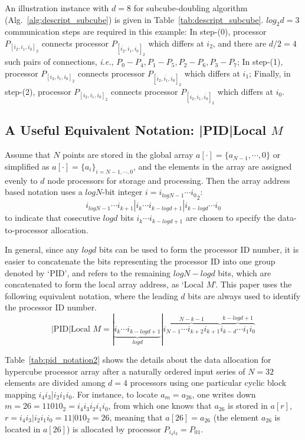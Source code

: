 \documentclass{iacrtrans}
\theoremstyle{plain}
\begin{document}
An illustration instance with $d=8$ for subcube-doubling algorithm (Alg.~\ref{alg:descript_subcube}) is given in Table~\ref{tab:descript_subcube}. $log_2d=3$ communication steps are required in this example: In step-(0), processor $P_{[i_{2},i_{1},i_{0}]_2}$ connects processor $P_{[\overline{i_{2}},i_{1},i_{0}]_2}$ which differs at $i_{2}$, and there are $d/2=4$ such pairs of connections, \textit{i.e.}, $P_0-P_4, P_1-P_5, P_2-P_6, P_3-P_7$; In step-(1), processor $P_{[i_{2},i_{1},i_{0}]_2}$ connects processor $P_{[i_{2},\overline{i_{1}},i_{0}]_2}$ which differs at $i_{1}$; Finally, in step-(2), processor $P_{[i_{2},i_{1},i_{0}]_2}$ connects processor $P_{[i_{2},i_{1},\overline{i_{0}}]_2}$ which differs at $i_{0}$.


\subsection{A Useful Equivalent Notation: |PID|Local $M$}
Assume that $N$ points are stored in the global array $a[\cdot]=\{a_{N-1},\cdots,0\}$ or simplified as $a[\cdot]=\{a_i\}_{i=N-1,\cdots,0}$, and the elements in the array are assigned evenly to $d$ node processors for storage and processing. Then the array address based notation uses a $log N$-bit integer $i={i_{logN-1}\cdots i_0}_2$:
\[
  i_{logN-1}\cdots i_{k+1}|i_k\cdots i_{k-logd+1}|i_{k-logd}\cdots i_0
\]
to indicate that cosecutive $logd$ bits $i_k\cdots i_{k-logd+1}$ are chosen to specify the data-to-processor allocation.

In general, since any $logd$ bits can be used to form the processor ID number, it is easier to concatenate the bits representing the processor ID into one group denoted by `PID', and refers to the remaining $logN-logd$ bits, which are concatenated to form the local array address, as `Local $M$'. This paper uses the following equivalent notation, where the leading $d$ bits are always used to identify the processor ID number.
\[
  |\text{PID}|\text{Local } M = |\underbrace{i_k\cdots i_{k-logd+1}}_{logd}|\overbrace{i_{N-1}\cdots i_{k+2}i_{k+1}}^{N-k-1}\overbrace{i_{k-d}\cdots i_1i_0}^{k-logd+1}
\]


Table~\ref{tab:pid_notation2} shows the details about the data allocation for hypercube processor array after a naturally ordered input series of $N=32$ elements are divided among $d=4$ processors using one particular cyclic block mapping $i_4i_3$|$i_2i_1i_0$. For instance, to locate $a_m=a_{26}$, one writes down $m=26=11010_2=i_4i_3i_2i_1i_0$, from which one knows that $a_{26}$ is stored in $a[r]$, $r=i_4i_3|i_2i_1i_0=11|010_2=26$, meaning that $a[26]=a_{26}$ (the element $a_{26}$ is located in $a[26]$) is allocated by processor $P_{i_4i_3}=P_{01}$.
\end{document}

